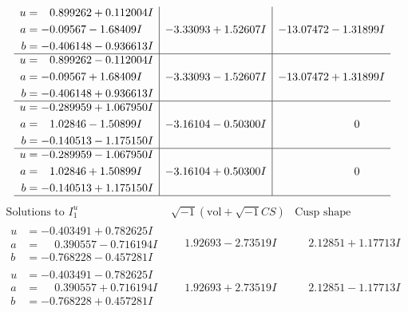 \documentclass[1p]{elsarticle_modified}
\theoremstyle{definition}
\newcommand{\I}{\sqrt{-1}}
\begin{document}
$$\begin{array}{c|c|c}
\begin{aligned}
u &= \phantom{-}0.899262 + 0.112004 I \\
a &= -0.09567 - 1.68409 I \\
b &= -0.406148 - 0.936613 I\end{aligned}
 & -3.33093 + 1.52607 I & -13.07472 - 1.31899 I \\ \hline\begin{aligned}
u &= \phantom{-}0.899262 - 0.112004 I \\
a &= -0.09567 + 1.68409 I \\
b &= -0.406148 + 0.936613 I\end{aligned}
 & -3.33093 - 1.52607 I & -13.07472 + 1.31899 I \\ \hline\begin{aligned}
u &= -0.289959 + 1.067950 I \\
a &= \phantom{-}1.02846 - 1.50899 I \\
b &= -0.140513 - 1.175150 I\end{aligned}
 & -3.16104 - 0.50300 I & \phantom{-0.000000 } 0 \\ \hline\begin{aligned}
u &= -0.289959 - 1.067950 I \\
a &= \phantom{-}1.02846 + 1.50899 I \\
b &= -0.140513 + 1.175150 I\end{aligned}
 & -3.16104 + 0.50300 I & \phantom{-0.000000 } 0\\
 \hline 
 \end{array}$$\newpage$$\begin{array}{c|c|c}  
\text{Solutions to }I^u_{1}& \I (\text{vol} + \sqrt{-1}CS) & \text{Cusp shape}\\
 \hline 
\begin{aligned}
u &= -0.403491 + 0.782625 I \\
a &= \phantom{-}0.390557 - 0.716194 I \\
b &= -0.768228 - 0.457281 I\end{aligned}
 & \phantom{-}1.92693 - 2.73519 I & \phantom{-}2.12851 + 1.17713 I \\ \hline\begin{aligned}
u &= -0.403491 - 0.782625 I \\
a &= \phantom{-}0.390557 + 0.716194 I \\
b &= -0.768228 + 0.457281 I\end{aligned}
 & \phantom{-}1.92693 + 2.73519 I & \phantom{-}2.12851 - 1.17713 I \\ \hline\begin{aligned}

\end{aligned}
\end{array}$$
\end{document}
